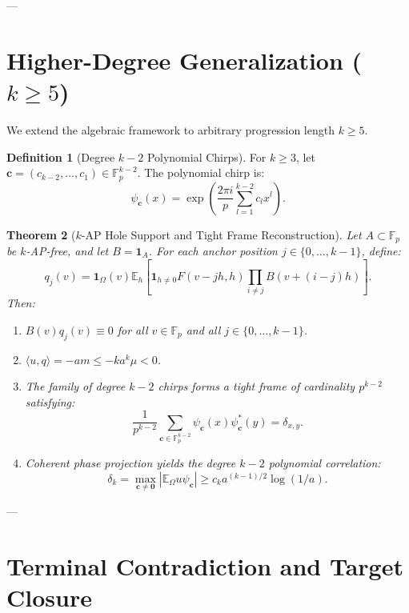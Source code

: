 \documentclass[11pt,reqno]{amsart}
\theoremstyle{plain}
\newtheorem{theorem}{Theorem}[section]
\theoremstyle{definition}
\newtheorem{definition}[theorem]{Definition}
\newcommand{\F}{\mathbb{F}}
\newcommand{\E}{\mathbb{E}}
\newcommand{\one}{\mathbf{1}}
\begin{document}
---

\section{Higher-Degree Generalization ($k \ge 5$)}

We extend the algebraic framework to arbitrary progression length $k \ge 5$.

\begin{definition}[Degree $k-2$ Polynomial Chirps]
For $k \ge 3$, let $\mathbf{c} = (c_{k-2}, \dots, c_1) \in \F_p^{k-2}$. The polynomial chirp is:
\begin{equation}
\psi_{\mathbf{c}}(x) = \exp\left( \frac{2\pi i}{p} \sum_{l=1}^{k-2} c_l x^l \right).
\end{equation}
\end{definition}

\begin{theorem}[$k$-AP Hole Support and Tight Frame Reconstruction]\label{thm:higher_k}
Let $A \subset \F_p$ be $k$-AP-free, and let $B = \one_A$.
For each anchor position $j \in \{0, \dots, k-1\}$, define:
\begin{equation}
q_j(v) = \one_\Omega(v) \E_h \left[ \one_{h \ne 0} F(v - jh, h) \prod_{i \ne j} B(v + (i - j)h) \right].
\end{equation}
Then:
\begin{enumerate}
\item $B(v) q_j(v) \equiv 0$ for all $v \in \F_p$ and all $j \in \{0, \dots, k-1\}$.
\item $\langle u, q \rangle = -am \le - k a^k \mu < 0$.
\item The family of degree $k-2$ chirps forms a tight frame of cardinality $p^{k-2}$ satisfying:
\begin{equation}
\frac{1}{p^{k-2}} \sum_{\mathbf{c} \in \F_p^{k-2}} \psi_{\mathbf{c}}(x) \psi_{\mathbf{c}}^*(y) = \delta_{x, y}.
\end{equation}
\item Coherent phase projection yields the degree $k-2$ polynomial correlation:
\begin{equation}
\delta_k = \max_{\mathbf{c} \ne \mathbf{0}} |\E_\Omega u \psi_{\mathbf{c}}| \ge c_k a^{(k-1)/2} \log(1/a).
\end{equation}
\end{enumerate}
\end{theorem}

---

\section{Terminal Contradiction and Target Closure}
\end{document}
